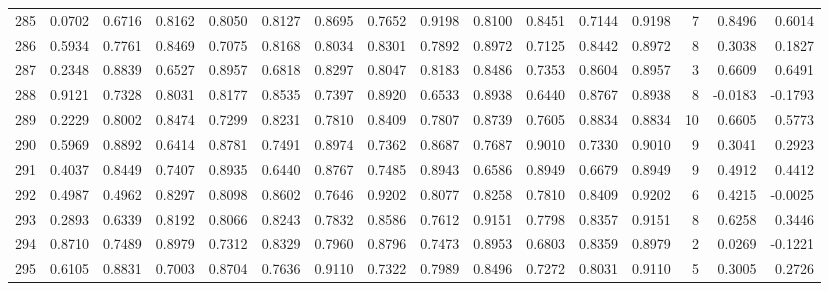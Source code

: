 \begin{tabular}{lrrrrrrrrrrrrrrr}
285 &      0.0702 &  0.6716 &  0.8162 &  0.8050 &  0.8127 &  0.8695 &  0.7652 &  0.9198 &  0.8100 &  0.8451 &   0.7144 &     0.9198 &      7 &                    0.8496 &                     0.6014 \\
286 &      0.5934 &  0.7761 &  0.8469 &  0.7075 &  0.8168 &  0.8034 &  0.8301 &  0.7892 &  0.8972 &  0.7125 &   0.8442 &     0.8972 &      8 &                    0.3038 &                     0.1827 \\
287 &      0.2348 &  0.8839 &  0.6527 &  0.8957 &  0.6818 &  0.8297 &  0.8047 &  0.8183 &  0.8486 &  0.7353 &   0.8604 &     0.8957 &      3 &                    0.6609 &                     0.6491 \\
288 &      0.9121 &  0.7328 &  0.8031 &  0.8177 &  0.8535 &  0.7397 &  0.8920 &  0.6533 &  0.8938 &  0.6440 &   0.8767 &     0.8938 &      8 &                   -0.0183 &                    -0.1793 \\
289 &      0.2229 &  0.8002 &  0.8474 &  0.7299 &  0.8231 &  0.7810 &  0.8409 &  0.7807 &  0.8739 &  0.7605 &   0.8834 &     0.8834 &     10 &                    0.6605 &                     0.5773 \\
290 &      0.5969 &  0.8892 &  0.6414 &  0.8781 &  0.7491 &  0.8974 &  0.7362 &  0.8687 &  0.7687 &  0.9010 &   0.7330 &     0.9010 &      9 &                    0.3041 &                     0.2923 \\
291 &      0.4037 &  0.8449 &  0.7407 &  0.8935 &  0.6440 &  0.8767 &  0.7485 &  0.8943 &  0.6586 &  0.8949 &   0.6679 &     0.8949 &      9 &                    0.4912 &                     0.4412 \\
292 &      0.4987 &  0.4962 &  0.8297 &  0.8098 &  0.8602 &  0.7646 &  0.9202 &  0.8077 &  0.8258 &  0.7810 &   0.8409 &     0.9202 &      6 &                    0.4215 &                    -0.0025 \\
293 &      0.2893 &  0.6339 &  0.8192 &  0.8066 &  0.8243 &  0.7832 &  0.8586 &  0.7612 &  0.9151 &  0.7798 &   0.8357 &     0.9151 &      8 &                    0.6258 &                     0.3446 \\
294 &      0.8710 &  0.7489 &  0.8979 &  0.7312 &  0.8329 &  0.7960 &  0.8796 &  0.7473 &  0.8953 &  0.6803 &   0.8359 &     0.8979 &      2 &                    0.0269 &                    -0.1221 \\
295 &      0.6105 &  0.8831 &  0.7003 &  0.8704 &  0.7636 &  0.9110 &  0.7322 &  0.7989 &  0.8496 &  0.7272 &   0.8031 &     0.9110 &      5 &                    0.3005 &                     0.2726 \\

\end{tabular}
